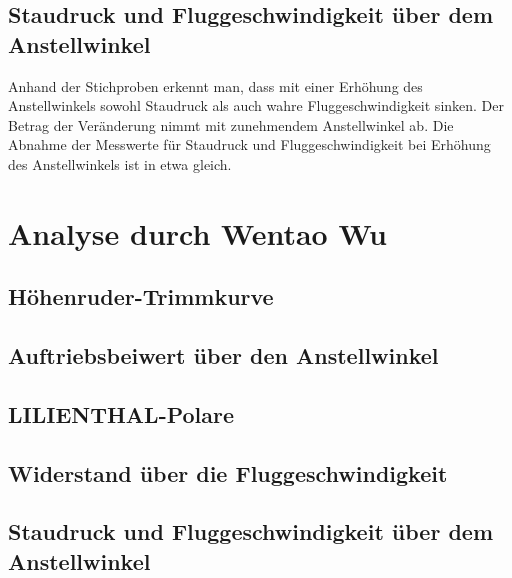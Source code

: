 \subsection{Staudruck und Fluggeschwindigkeit über dem Anstellwinkel}
Anhand der Stichproben erkennt man, dass mit einer Erhöhung des Anstellwinkels sowohl Staudruck als auch wahre Fluggeschwindigkeit sinken. Der Betrag der Veränderung nimmt mit zunehmendem Anstellwinkel ab. Die Abnahme der Messwerte für Staudruck und Fluggeschwindigkeit bei Erhöhung des Anstellwinkels ist in etwa gleich.
\newpage

\section{Analyse durch Wentao Wu}
\subsection{Höhenruder-Trimmkurve}
\subsection{Auftriebsbeiwert über den Anstellwinkel}
\subsection{LILIENTHAL-Polare}
\subsection{Widerstand über die Fluggeschwindigkeit}
\subsection{Staudruck und Fluggeschwindigkeit über dem Anstellwinkel}
\newpage
	
